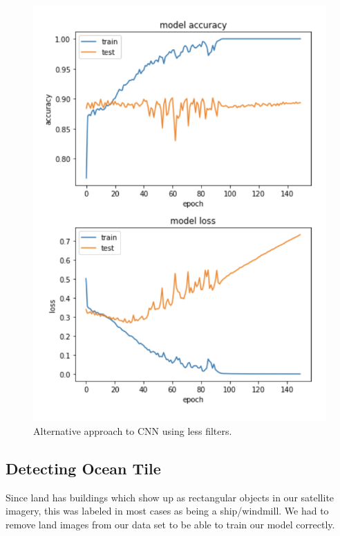 \begin{figure}[ht]
\begin{center}
\centerline{\includegraphics[width=\columnwidth]{images/cnn-training-naive.png}}
\caption{Alternative approach to CNN using less filters.}
\label{cnn-naive}
\end{center}
\end{figure}

\subsection{Detecting Ocean Tile}

Since land has buildings which show up as rectangular objects in our satellite imagery, this was labeled in most cases as being a ship/windmill. We had to remove land images from our data set to be able to train our model correctly.\\

